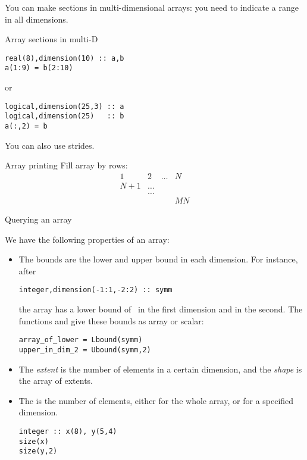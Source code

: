 You can make sections in multi-dimensional arrays: you need to
indicate a range in all dimensions.

\begin{block}{Array sections in multi-D}
  \label{sl:farray-sectiond}
\begin{lstlisting}
real(8),dimension(10) :: a,b
a(1:9) = b(2:10)
\end{lstlisting}
or
\begin{lstlisting}
logical,dimension(25,3) :: a
logical,dimension(25)   :: b
a(:,2) = b
\end{lstlisting}
You can also use strides.
\end{block}

\begin{block}{Array printing}
  \label{sl:farray-print}
  Fill array by rows:
  \[ \begin{matrix}1&2&\ldots&N\\ N+1&\ldots\\ &\ldots\\ &&&MN
  \end{matrix}
  \]
\end{block}

 {Querying an array}

We have the following properties of an array:
\begin{itemize}
\item The bounds are the lower and upper bound in each dimension.
  For instance, after
\begin{lstlisting}
integer,dimension(-1:1,-2:2) :: symm
\end{lstlisting}
the array  has a lower bound of~ in the first dimension
and  in the second. The functions  and
 give these bounds as array or scalar:
\begin{lstlisting}
array_of_lower = Lbound(symm)
upper_in_dim_2 = Ubound(symm,2)
\end{lstlisting}


\item The \emph{extent} is the number
  of elements in a certain dimension, and the
  \emph{shape} is the array of extents.

\item The  is the number of elements, either for
  the whole array, or for a specified dimension.
\begin{lstlisting}
integer :: x(8), y(5,4)
size(x)
size(y,2)
\end{lstlisting}
\end{itemize}

